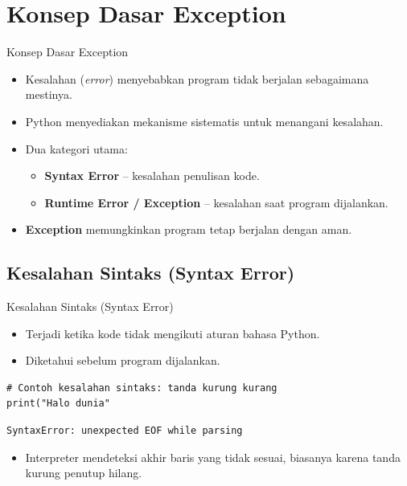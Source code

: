 \documentclass[aspectratio=169, table]{beamer}
\begin{document}
\section{Konsep Dasar Exception}

\begin{frame}[fragile]{Konsep Dasar Exception}
\vspace*{20pt}
\begin{itemize}
  \item Kesalahan (\textit{error}) menyebabkan program tidak berjalan sebagaimana mestinya.
  \item Python menyediakan mekanisme sistematis untuk menangani kesalahan.
  \item Dua kategori utama:
    \begin{itemize}
        \item \textbf{Syntax Error} – kesalahan penulisan kode.
        \item \textbf{Runtime Error / Exception} – kesalahan saat program dijalankan.
    \end{itemize}
  \item \textbf{Exception} memungkinkan program tetap berjalan dengan aman.
\end{itemize}
\end{frame}

\subsection*{Kesalahan Sintaks (Syntax Error)}
\begin{frame}[fragile]{Kesalahan Sintaks (Syntax Error)}
\vspace*{20pt}
\begin{itemize}
  \item Terjadi ketika kode tidak mengikuti aturan bahasa Python.
  \item Diketahui sebelum program dijalankan.
\end{itemize}

\begin{lstlisting}[style=PythonStyle]
# Contoh kesalahan sintaks: tanda kurung kurang
print("Halo dunia"
\end{lstlisting}

\begin{lstlisting}[language=bash]
SyntaxError: unexpected EOF while parsing
\end{lstlisting}

\begin{itemize}
  \item Interpreter mendeteksi akhir baris yang tidak sesuai,
  biasanya karena tanda kurung penutup hilang.
\end{itemize}
\end{frame}
\end{document}
